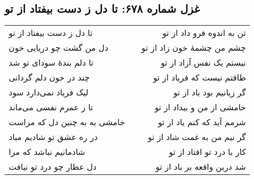 \begin{center}
\section*{غزل شماره ۶۷۸: تا دل ز دست بیفتاد از تو}
\label{sec:678}
\begin{longtable}{l p{0.5cm} r}
تا دل ز دست بیفتاد از تو
&&
تن به اندوه فرو داد از تو
\\
دل من گشت چو دریایی خون
&&
چشم من چشمهٔ خون زاد از تو
\\
تا دلم بندهٔ سودای تو شد
&&
نیستم یک نفس آزاد از تو
\\
چند در خون دلم گردانی
&&
طاقتم نیست که فریاد از تو
\\
لیک فریاد نمی‌دارد سود
&&
گر زیانیم بود باد از تو
\\
تا ز عمرم نفسی می‌ماند
&&
خامشی از من و بیداد از تو
\\
خامشی به به چنین دل که مراست
&&
شرمم آید که کنم یاد از تو
\\
در ره عشق تو شادیم مباد
&&
گر نیم من به غمت شاد از تو
\\
شادمانیم نباشد که مرا
&&
کار با درد تو افتاد از تو
\\
دل عطار چو درد تو نیافت
&&
شد درین واقعه بر باد از تو
\\
\end{longtable}
\end{center}
